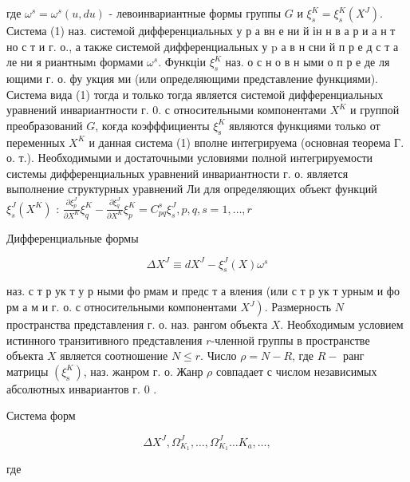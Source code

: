 \documentclass[10pt]{article}
\begin{document}
где $\omega^{s}=\omega^{s}(u, d u)$ - левоинвариантные формы группы $G$ и $\xi_{s}^{K}=\xi_{s}^{K}\left(X^{J}\right)$. Система (1) наз. системой дифференциальных у р а вн е ни й ін н в а р и а н т но с т и г. о., а также системой дифференциальных у $\mathrm{p}$ а в н сни й п р е д с т а ле ни я риантнымı формами $\omega^{s}$. Функціи $\xi_{s}^{K}$ наз. о с н о в н ыми о п р е де ля ющими г. о. фу укция ми (или определяющими представление функциями). Система вида (1) тогда и только тогда является системой дифференциальных уравнений инвариантности $г$. 0. с относительными компонентами $X^{K}$ и группой преобразований $G$, коғда коэфффициенты $\xi_{\mathrm{s}}^{K}$ являются функциями только от переменных $X^{K}$ и данная система (1) вполне интегрируема (основная теорема Г. о. т.). Необходимыми и достаточными условиями полной интегрируемости системы дифференциальных уравнений инвариантности г. о. является выполнение структурных уравнений Ли для определяющих объект функций $\xi_{s}^{J}\left(X^{K}\right)$ : $\frac{\partial \xi_{p}^{J}}{\partial X^{K}} \xi_{q}^{K}-\frac{\partial \xi_{q}^{J}}{\partial X^{K}} \xi_{p}^{K}=C_{p q}^{s} \xi_{s}^{J}, p, q, s=1, \ldots, r$



Дифференциальные формы



\[

\Delta X^{J} \equiv d X^{J}-\xi_{s}^{J}(X) \omega^{s}

\]



наз. с т р ук т у р ными фо рмам и предс т а вления (или с т р ук т урным и фо рм а м и г. о. с относительными компонентами $\left.X^{J}\right)$. Размерность $N$ пространства представления г. о. наз. рангом объекта $X$. Необходимым условием истинного транзитивного представления $r$-членной группы в пространстве объекта $X$ является соотношение $N \leqslant r$. Число $\rho=N-R$, где $R-$ ранг матрицы $\left(\xi_{\mathrm{s}}^{K}\right)$, наз. жанром г. о. Жанр $\rho$ совпадает с числом независимых абсолютных инвариантов г. 0 .



Система форм



\[

\Delta X^{J}, \Omega_{K_{1}}^{J}, \ldots, \Omega_{K_{1}}^{J} \ldots K_{a}, \ldots,

\]



где
\end{document}
